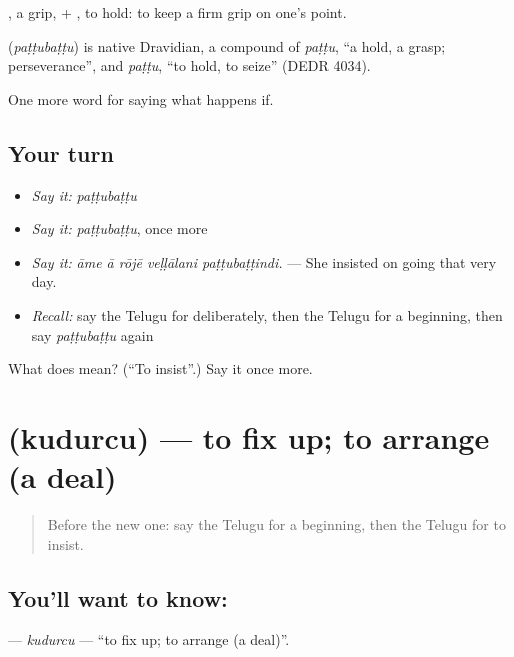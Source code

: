 , a grip, + , to hold: to keep a firm grip on one’s point.

\begin{cousinweb}
\textbf{} (\emph{paṭṭubaṭṭu}) is native Dravidian, a compound of \emph{paṭṭu}, \textquotedblleft{}a hold, a grasp; perseverance\textquotedblright{}, and \emph{paṭṭu}, \textquotedblleft{}to hold, to seize\textquotedblright{} (DEDR 4034).
\end{cousinweb}

\begin{grammarlens}[title={What you've built}]
One more word for saying what happens if.
\end{grammarlens}

\subsection*{Your turn}
\begin{itemize}
\raggedright
  \item \emph{Say it:} \emph{paṭṭubaṭṭu}
  \item \emph{Say it:} \emph{paṭṭubaṭṭu}, once more
  \item \emph{Say it:} \emph{āme ā rōjē veḷḷālani paṭṭubaṭṭindi.} — She insisted on going that very day.
  \item \emph{Recall:} say the Telugu for deliberately, then the Telugu for a beginning, then say \emph{paṭṭubaṭṭu} again
\end{itemize}

\begin{tcolorbox}[breakable,colback=teal!4,colframe=teal!35!black,title={Before you move on}]
What does  mean? (\textquotedblleft{}To insist\textquotedblright{}.) Say it once more.
\end{tcolorbox}
\section[\texorpdfstring{\te{కుదుర్చు} (kudurcu)}{కుదుర్చు (kudurcu)}]{ (kudurcu) — to fix up; to arrange (a deal)}

\label{lesson:TE-C427-kudurcu}



\begin{quote}
Before the new one: say the Telugu for a beginning, then the Telugu for to insist.
\end{quote}

\subsection*{You'll want to know: }
\textbf{} — \emph{kudurcu} — \textquotedblleft{}to fix up; to arrange (a deal)\textquotedblright{}.

